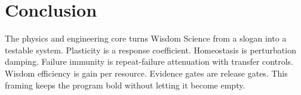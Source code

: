 \documentclass[11pt]{article}
\begin{document}
\section{Conclusion}

The physics and engineering core turns Wisdom Science from a slogan into a testable system.
Plasticity is a response coefficient.
Homeostasis is perturbation damping.
Failure immunity is repeat-failure attenuation with transfer controls.
Wisdom efficiency is gain per resource.
Evidence gates are release gates.
This framing keeps the program bold without letting it become empty.
\end{document}
